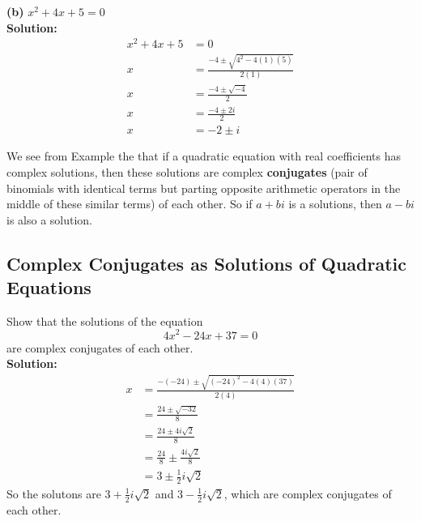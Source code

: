\textbf{(b)} $x^2+4x+5=0$ \\
\textbf{Solution:} \\
\begin{align*}
    x^2+4x+5 & =0                                    \\
    x        & =\frac{-4\pm\sqrt{4^2-4(1)(5)}}{2(1)} \\
    x        & =\frac{-4\pm\sqrt{-4}}{2}             \\
    x        & =\frac{-4\pm2i}{2}                    \\
    x        & =-2\pm i
\end{align*}

We see from Example the that if a quadratic equation with real coefficients has complex solutions, then these solutions are complex \textbf{conjugates} (pair of binomials with identical terms but parting opposite arithmetic operators in the middle of these similar terms) of each other. 
So if $a+bi$ is a solutions, then $a-bi$ is also a solution.

\subsection{Complex Conjugates as Solutions of Quadratic Equations}

Show that the solutions of the equation $$4x^2-24x+37=0$$ are complex conjugates of each other. \\
\newline
\textbf{Solution:} \\
\begin{align*}
    x & =\frac{-(-24)\pm\sqrt{(-24)^2-4(4)(37)}}{2(4)} \\
      & =\frac{24\pm\sqrt{-32}}{8}                      \\
      & =\frac{24\pm4i\sqrt{2}}{8}                      \\
      & =\frac{24}{8}\pm\frac{4i\sqrt{2}}{8}            \\
      & =3\pm\frac{1}{2}i\sqrt{2}
\end{align*}
So the solutons are $3+\frac{1}{2}i\sqrt{2}$ and $3-\frac{1}{2}i\sqrt{2}$, which are complex conjugates of each other.